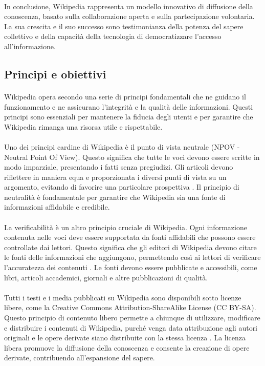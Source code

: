 \documentclass[12pt,a4paper]{report}
\begin{document}
\paragraph*{}
In conclusione, Wikipedia rappresenta un modello innovativo di diffusione della conoscenza, basato sulla collaborazione aperta e sulla partecipazione volontaria. La sua crescita e il suo successo sono testimonianza della potenza del sapere collettivo e della capacità della tecnologia di democratizzare l'accesso all'informazione.

\subsection{Principi e obiettivi}
\paragraph*{}
Wikipedia opera secondo una serie di principi fondamentali che ne guidano il funzionamento e ne assicurano l'integrità e la qualità delle informazioni. Questi principi sono essenziali per mantenere la fiducia degli utenti e per garantire che Wikipedia rimanga una risorsa utile e rispettabile.
\paragraph*{}
Uno dei principi cardine di Wikipedia è il punto di vista neutrale (NPOV - Neutral Point Of View). Questo significa che tutte le voci devono essere scritte in modo imparziale, presentando i fatti senza pregiudizi. Gli articoli devono riflettere in maniera equa e proporzionata i diversi punti di vista su un argomento, evitando di favorire una particolare prospettiva \cite{reagle2010good}. Il principio di neutralità è fondamentale per garantire che Wikipedia sia una fonte di informazioni affidabile e credibile.
\paragraph*{}
La verificabilità è un altro principio cruciale di Wikipedia. Ogni informazione contenuta nelle voci deve essere supportata da fonti affidabili che possono essere controllate dai lettori. Questo significa che gli editori di Wikipedia devono citare le fonti delle informazioni che aggiungono, permettendo così ai lettori di verificare l'accuratezza dei contenuti \cite{denning2005wikipedia}. Le fonti devono essere pubblicate e accessibili, come libri, articoli accademici, giornali e altre pubblicazioni di qualità.
\paragraph*{}
Tutti i testi e i media pubblicati su Wikipedia sono disponibili sotto licenze libere, come la Creative Commons Attribution-ShareAlike License (CC BY-SA). Questo principio di contenuto libero permette a chiunque di utilizzare, modificare e distribuire i contenuti di Wikipedia, purché venga data attribuzione agli autori originali e le opere derivate siano distribuite con la stessa licenza \cite{jemielniak2014wikipedia}. La licenza libera promuove la diffusione della conoscenza e consente la creazione di opere derivate, contribuendo all'espansione del sapere.
\end{document}

